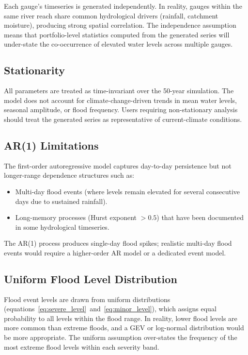 \documentclass[11pt,a4paper]{article}
\begin{document}
Each gauge's timeseries is generated independently. In reality, gauges within the same
river reach share common hydrological drivers (rainfall, catchment moisture), producing
strong spatial correlation. The independence assumption means that portfolio-level
statistics computed from the generated series will under-state the co-occurrence of
elevated water levels across multiple gauges.

\subsection{Stationarity}

All parameters are treated as time-invariant over the 50-year simulation. The model does
not account for climate-change-driven trends in mean water levels, seasonal amplitude,
or flood frequency. Users requiring non-stationary analysis should treat the generated
series as representative of current-climate conditions.

\subsection{AR(1) Limitations}

The first-order autoregressive model captures day-to-day persistence but not longer-range
dependence structures such as:
\begin{itemize}[nosep]
    \item Multi-day flood events (where levels remain elevated for several consecutive
          days due to sustained rainfall).
    \item Long-memory processes (Hurst exponent $> 0.5$) that have been documented in
          some hydrological timeseries.
\end{itemize}

\noindent The AR(1) process produces single-day flood spikes; realistic multi-day flood
events would require a higher-order AR model or a dedicated event model.

\subsection{Uniform Flood Level Distribution}

Flood event levels are drawn from uniform distributions
(equations~\ref{eq:severe_level}~and~\ref{eq:minor_level}), which assigns equal
probability to all levels within the flood range. In reality, lower flood levels are
more common than extreme floods, and a GEV or log-normal distribution would be more
appropriate. The uniform assumption over-states the frequency of the most extreme
flood levels within each severity band.
\end{document}

